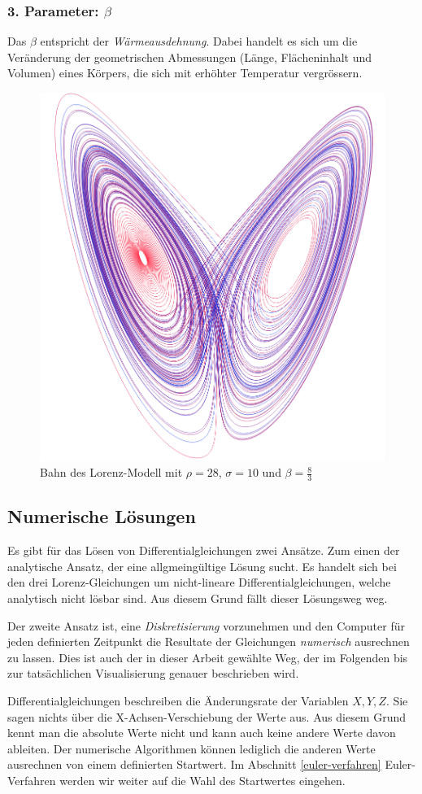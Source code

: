 \subsubsection{3. Parameter: $\beta$}
Das $ \beta $ entspricht der \textit{Wärmeausdehnung}. Dabei handelt es sich um die Veränderung der geometrischen Abmessungen (Länge, Flächeninhalt und Volumen) eines Körpers, die sich mit erhöhter Temperatur vergrössern.

\begin{figure}
	\centering
	\includegraphics[width=0.3\linewidth]{lorenz/assets/lorenz-modell/lorenz-modell}
	\caption{Bahn des Lorenz-Modell mit $\rho = 28$, $\sigma = 10$ und $\beta = \frac{8}{3}$}
	\label{fig:lorenz-modell}
\end{figure}


\subsection{Numerische Lösungen}
Es gibt für das Lösen von Differentialgleichungen zwei Ansätze. Zum einen der analytische Ansatz, der eine allgmeingültige Lösung sucht. Es handelt sich bei den drei Lorenz-Gleichungen um nicht-lineare Differentialgleichungen, welche analytisch nicht lösbar sind. Aus diesem Grund fällt dieser Lösungsweg weg. 

Der zweite Ansatz ist, eine \textit{Diskretisierung} vorzunehmen und den Computer für jeden definierten Zeitpunkt die Resultate der Gleichungen \textit{numerisch} ausrechnen zu lassen. Dies ist auch der in dieser Arbeit gewählte Weg, der im Folgenden bis zur tatsächlichen Visualisierung genauer beschrieben wird.

Differentialgleichungen beschreiben die Änderungsrate der Variablen $ X, Y, Z $. Sie sagen nichts über die X-Achsen-Verschiebung der Werte aus. Aus diesem Grund kennt man die absolute Werte nicht und kann auch keine andere Werte davon ableiten. Der numerische Algorithmen können lediglich die anderen Werte ausrechnen von einem definierten Startwert. Im Abschnitt \ref{euler-verfahren} Euler-Verfahren werden wir weiter auf die Wahl des Startwertes eingehen.

